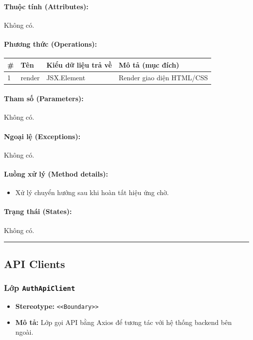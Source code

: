 \documentclass[12pt,a4paper]{article}
\begin{document}
\paragraph{Thuộc tính (Attributes):}
Không có.

\paragraph{Phương thức (Operations):}
\begin{longtable}{|p{0.6cm}|p{3.8cm}|p{2.6cm}|p{6.5cm}|}
\hline
\textbf{\#} & \textbf{Tên} & \textbf{Kiểu dữ liệu trả về} & \textbf{Mô tả (mục đích)} \\ \hline
\endhead
1 & render & JSX.Element & Render giao diện HTML/CSS \\ \hline
\end{longtable}

\paragraph{Tham số (Parameters):}
Không có.

\paragraph{Ngoại lệ (Exceptions):}
Không có.

\paragraph{Luồng xử lý (Method details):}
\begin{itemize}[leftmargin=*]
    \item Xử lý chuyển hướng sau khi hoàn tất hiệu ứng chờ.
\end{itemize}


\paragraph{Trạng thái (States):}
Không có.

\vskip 0.5cm
\noindent\rule{\textwidth}{0.5pt}
\vskip 0.5cm

\subsection{API Clients}

\subsubsection{Lớp \texttt{AuthApiClient}}
\begin{itemize}[leftmargin=*]
    \item \textbf{Stereotype:} \texttt{\textless{}\textless{}Boundary\textgreater{}\textgreater{}}
    \item \textbf{Mô tả:} Lớp gọi API bằng Axios để tương tác với hệ thống backend bên ngoài.
\end{itemize}
\end{document}

